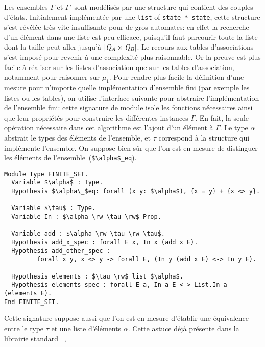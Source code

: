 Les ensembles $\Gamma$ et $\Gamma'$ sont modélisés par une structure
qui contient des couples d'états. Initialement implémentée par une \lstinline!list! of \lstinline!state * state!,
cette structure s'est révélée très vite insuffisante pour de gros automates: en effet la recherche d'un élément
dans une liste est peu efficace, puisqu'il faut parcourir toute la liste dont la taille peut aller jusqu'à $|\mathit Q_\mathit A \times \mathit Q_\mathit B|$.
Le recours aux tables d'associations s'est imposé pour revenir à une complexité plus raisonnable.
Or la preuve est plus facile à réaliser sur les listes d'association que sur les tables d'association,
notamment pour raisonner sur $\mu_1$.
Pour rendre plus facile la définition d'une mesure pour n'importe quelle implémentation d'ensemble fini
(par exemple les listes ou les tables), on utilise l'interface suivante pour abstraire l'implémentation 
de l'ensemble fini: cette signature de module isole les fonctions nécessaires ainsi que leur propriétés pour construire
les différentes instances $\Gamma$. En fait, la seule opération nécessaire dans cet algorithme est l'ajout d'un élément à $\Gamma$.
Le type $\alpha$ abstrait le types des éléments de l'ensemble, et $\tau$ correspond à la structure qui implémente l'ensemble.
On suppose bien sûr que l'on est en mesure de distinguer les éléments de l'ensemble~(\lstinline!$\alpha$_eq!).
\begin{lstlisting}
Module Type FINITE_SET.
  Variable $\alpha$ : Type.
  Hypothesis $\alpha\_$eq: forall (x y: $\alpha$), {x = y} + {x <> y}.
  
  Variable $\tau$ : Type.
  Variable In : $\alpha \rw \tau \rw$ Prop.
  
  Variable add : $\alpha \rw \tau \rw \tau$.
  Hypothesis add_x_spec : forall E x, In x (add x E).
  Hypothesis add_other_spec :
         forall x y, x <> y -> forall E, (In y (add x E) <-> In y E).

  Hypothesis elements : $\tau \rw$ list $\alpha$.
  Hypothesis elements_spec : forall E a, In a E <-> List.In a (elements E).
End FINITE_SET.
\end{lstlisting}
Cette signature suppose aussi que l'on est en mesure d'établir une équivalence entre le type $\tau$ et une
liste d'éléments $\alpha$. Cette astuce déjà présente dans la librairie standard \coq~\cite{coq-stdlib}, 
